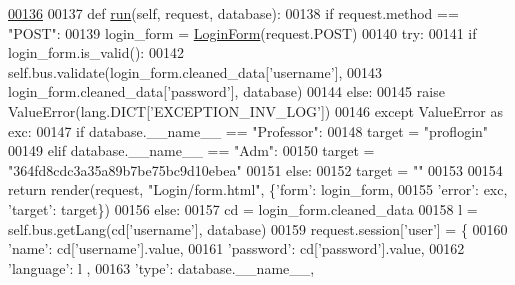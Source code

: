 \begin{DoxyCode}
\hypertarget{classLogin_1_1LoginUnit_1_1UiLogin_l00136}{}\hyperlink{classLogin_1_1LoginUnit_1_1UiLogin_a9cd61a78d5ab0d201051ccf5898f86bc}{00136} 
00137     \textcolor{keyword}{def }\hyperlink{classLogin_1_1LoginUnit_1_1UiLogin_a9cd61a78d5ab0d201051ccf5898f86bc}{run}(self, request, database):
00138         \textcolor{keywordflow}{if} request.method == \textcolor{stringliteral}{"POST"}:
00139             login\_form = \hyperlink{classLogin_1_1forms_1_1LoginForm}{LoginForm}(request.POST)
00140             \textcolor{keywordflow}{try}: 
00141                 \textcolor{keywordflow}{if} login\_form.is\_valid():
00142                     self.bus.validate(login\_form.cleaned\_data[\textcolor{stringliteral}{'username'}],
00143                         login\_form.cleaned\_data[\textcolor{stringliteral}{'password'}], database)
00144                 \textcolor{keywordflow}{else}:
00145                     \textcolor{keywordflow}{raise} ValueError(lang.DICT[\textcolor{stringliteral}{'EXCEPTION\_INV\_LOG'}])
00146             \textcolor{keywordflow}{except} ValueError \textcolor{keyword}{as} exc:
00147                 \textcolor{keywordflow}{if} database.\_\_name\_\_ == \textcolor{stringliteral}{"Professor"}:
00148                     target = \textcolor{stringliteral}{"proflogin"}
00149                 \textcolor{keywordflow}{elif} database.\_\_name\_\_ == \textcolor{stringliteral}{"Adm"}:
00150                     target = \textcolor{stringliteral}{"364fd8cdc3a35a89b7be75bc9d10ebea"}
00151                 \textcolor{keywordflow}{else}:
00152                     target = \textcolor{stringliteral}{""}
00153 
00154                 \textcolor{keywordflow}{return} render(request, \textcolor{stringliteral}{"Login/form.html"}, \{\textcolor{stringliteral}{'form'}: login\_form, 
00155                     \textcolor{stringliteral}{'error'}: exc, \textcolor{stringliteral}{'target'}: target\})
00156             \textcolor{keywordflow}{else}:
00157                 cd = login\_form.cleaned\_data
00158                 l = self.bus.getLang(cd[\textcolor{stringliteral}{'username'}], database)
00159                 request.session[\textcolor{stringliteral}{'user'}] = \{
00160                                 \textcolor{stringliteral}{'name'}: cd[\textcolor{stringliteral}{'username'}].value,
00161                                 \textcolor{stringliteral}{'password'}: cd[\textcolor{stringliteral}{'password'}].value,
00162                                 \textcolor{stringliteral}{'language'}: l ,
00163                                 \textcolor{stringliteral}{'type'}: database.\_\_name\_\_,

\end{DoxyCode}
